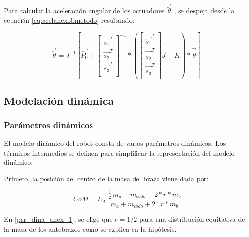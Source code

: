         Para calcular la aceleración angular de los actuadores  \( \overrightarrow{\ddot{ \theta }} \) , se despeja desde la ecuación \ref{eq:acelanexobmetodo} resultando:
        
         \[ \overrightarrow{\ddot{ \theta }}=J^{-1} \left[ \overrightarrow{\ddot{P_{0}}}+ \left[ \begin{matrix}
        \overrightarrow{s_{1}}^{T}\\
        \overrightarrow{s_{2}}^{T}\\
        \overrightarrow{s_{3}}^{T}\\
        \end{matrix}
         \right] ^{-1}\ast \left(  \left[ \begin{matrix}
        \overrightarrow{\dot{s}_{1}}^{T}\\
        \overrightarrow{\dot{s}_{2}}^{T}\\
        \overrightarrow{\dot{s}_{3}}^{T}\\
        \end{matrix}
         \right]  J+K \right) \ast\overrightarrow{\dot{ \theta }} \right] ~ \] 
        
        



         \newpage



        \subsection{Modelación dinámica}
        
            \subsubsection{Parámetros dinámicos}
                El modelo dinámico del robot consta de varios parámetros dinámicos. Los términos intermedios se definen para simplificar la representación del modelo dinámico.
                
                 Primero, la posición del centro de la masa del brazo viene dada por:
                
                \begin{equation}
                 CoM=L_{A}~\frac{\frac{1}{2}~m_{a}+m_{codo}+2\ast r\ast m_{b}}{m_{a}+m_{codo}+2\ast r\ast m_{b}}
                \label{par_dina_anex_1}                    
                \end{equation}

                En \ref{par_dina_anex_1}, se elige que $r=1/2$ para una distribución equitativa de la masa de los antebrazos como se explica en la hipótesis.
                
